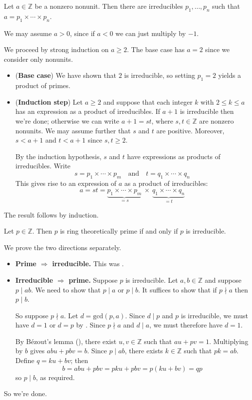 \begin{lemma}
\label{lemFTAExists}
Let $a \in \mathbb{Z}$ be a nonzero nonunit. Then there are irreducibles $p_1, \dots, p_n$ such that $a = p_1 \times \cdots \times p_n$.
\end{lemma}
\begin{cproof}
We may assume $a>0$, since if $a<0$ we can just multiply by $-1$.

We proceed by strong induction on $a \ge 2$. The base case has $a=2$ since we consider only nonunits.
\begin{itemize}
\item (\textbf{Base case}) We have shown that $2$ is irreducible, so setting $p_1=2$ yields a product of primes.
\item (\textbf{Induction step}) Let $a \ge 2$ and suppose that each integer $k$ with $2 \le k \le a$ has an expression as a product of irreducibles. If $a+1$ is irreducible then we're done; otherwise we can write $a+1=st$, where $s,t \in \mathbb{Z}$ are nonzero nonunits. We may assume further that $s$ and $t$ are positive. Moreover, $s<a+1$ and $t<a+1$ since $s,t \ge 2$.

By the induction hypothesis, $s$ and $t$ have expressions as products of irreducibles. Write
\[ s = p_1 \times \cdots \times p_m \quad \text{and} \quad t = q_1 \times \cdots \times q_n \]
This gives rise to an expression of $a$ as a product of irreducibles:
\[ a = st = \underbrace{p_1 \times \cdots \times p_m}_{= s} ~\times~ \underbrace{q_1 \times \cdots \times q_n}_{= t} \]
\end{itemize}
The result follows by induction.
\end{cproof}

\begin{theorem}
\label{thmPrimeIffIrred}
Let $p \in \mathbb{Z}$. Then $p$ is ring theoretically prime if and only if $p$ is irreducible.
\end{theorem}
\begin{cproof}
We prove the two directions separately.
\begin{itemize}
\item \textbf{Prime $\Rightarrow$ irreducible.} This was .
\item \textbf{Irreducible $\Rightarrow$ prime.} Suppose $p$ is irreducible. Let $a,b \in \mathbb{Z}$ and suppose $p \mid ab$. We need to show that $p \mid a$ or $p \mid b$. It suffices to show that if $p \nmid a$ then $p \mid b$.

So suppose $p \nmid a$. Let $d = \mathrm{gcd}(p,a)$. Since $d \mid p$ and $p$ is irreducible, we must have $d=1$ or $d=p$ by . Since $p \nmid a$ and $d \mid a$, we must therefore have $d=1$.

By B\'{e}zout's lemma (), there exist $u,v \in \mathbb{Z}$ such that $au+pv=1$. Multiplying by $b$ gives $abu+pbv=b$. Since $p \mid ab$, there exists $k \in \mathbb{Z}$ such that $pk=ab$.
Define $q = ku+bv$; then
\[ b = abu+pbv = pku+pbv = p(ku+bv) = qp \]
so $p \mid b$, as required.
\end{itemize}
So we're done.
\end{cproof}

